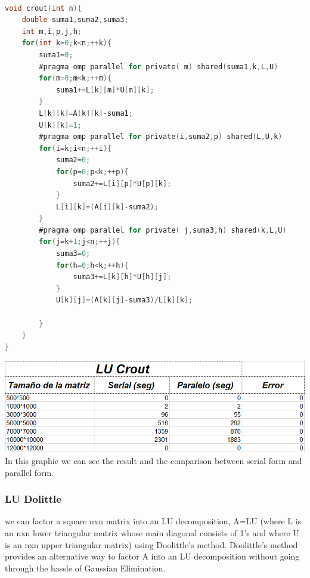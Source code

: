 \documentclass{article}
\newcounter{subsubsubsection}[subsubsection]
\begin{document}

\begin{lstlisting}[language=C]

void crout(int n){
    double suma1,suma2,suma3;
    int m,i,p,j,h;
    for(int k=0;k<n;++k){
        suma1=0;
        #pragma omp parallel for private( m) shared(suma1,k,L,U)
        for(m=0;m<k;++m){
            suma1+=L[k][m]*U[m][k];
        }
        L[k][k]=A[k][k]-suma1;
        U[k][k]=1;
        #pragma omp parallel for private(i,suma2,p) shared(L,U,k)
        for(i=k;i<n;++i){
            suma2=0;
            for(p=0;p<k;++p){
                suma2+=L[i][p]*U[p][k];
            }
            L[i][k]=(A[i][k]-suma2);
        }
        #pragma omp parallel for private( j,suma3,h) shared(k,L,U)
        for(j=k+1;j<n;++j){
            suma3=0;
            for(h=0;h<k;++h){
                suma3+=L[k][h]*U[h][j];
            }
            U[k][j]=(A[k][j]-suma3)/L[k][k];
         
        }
    }
}

\end{lstlisting}


\includegraphics[width=\linewidth]{./images/crout.PNG}\\
In this graphic we can see the result and the comparison between serial form and parallel form.

\newpage

\subsubsection{LU Dolittle}


we can factor a square nxn matrix into an LU decomposition, A=LU (where L is an nxn lower triangular matrix whose main diagonal consists of 1's and where U is an nxn upper triangular matrix) using Doolittle's method. Doolittle's method provides an alternative way to factor A into an LU decomposition without going through the hassle of Gaussian Elimination.
\end{document}
